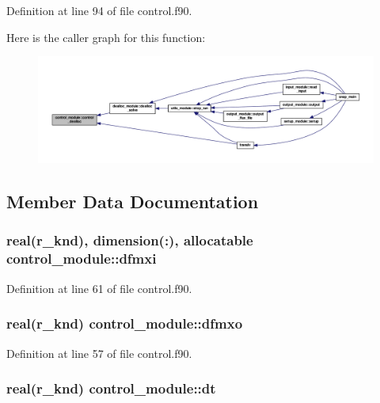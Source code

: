 Definition at line 94 of file control.\-f90.



Here is the caller graph for this function\-:\nopagebreak
\begin{figure}[H]
\begin{center}
\leavevmode
\includegraphics[width=350pt]{classcontrol__module_a2f968e7fae2c9dab97d81d4e8db154c8_icgraph}
\end{center}
\end{figure}




\subsection{Member Data Documentation}
\hypertarget{classcontrol__module_a39abfd20b09ff5ed5e22b69c92038156}{
\subsubsection[{dfmxi}]{\setlength{\rightskip}{0pt plus 5cm}real(r\-\_\-knd), dimension(\-:), allocatable control\-\_\-module\-::dfmxi}}\label{classcontrol__module_a39abfd20b09ff5ed5e22b69c92038156}


Definition at line 61 of file control.\-f90.

\hypertarget{classcontrol__module_a53a34dce98c72051d0043743774ea209}{
\subsubsection[{dfmxo}]{\setlength{\rightskip}{0pt plus 5cm}real(r\-\_\-knd) control\-\_\-module\-::dfmxo}}\label{classcontrol__module_a53a34dce98c72051d0043743774ea209}


Definition at line 57 of file control.\-f90.

\hypertarget{classcontrol__module_af466573cb3712b4a00c930a1720eeb68}{
\subsubsection[{dt}]{\setlength{\rightskip}{0pt plus 5cm}real(r\-\_\-knd) control\-\_\-module\-::dt}}\label{classcontrol__module_af466573cb3712b4a00c930a1720eeb68}


